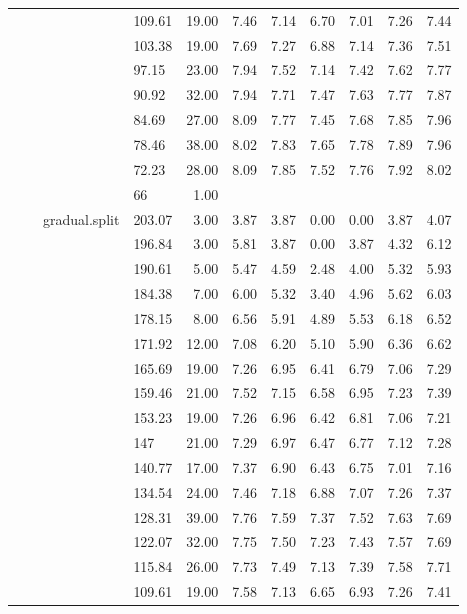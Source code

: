 \begin{longtable}{llllrrrrrrr}
   &  &  & 109.61 & 19.00 & 7.46 & 7.14 & 6.70 & 7.01 & 7.26 & 7.44 \\ 
   &  &  & 103.38 & 19.00 & 7.69 & 7.27 & 6.88 & 7.14 & 7.36 & 7.51 \\ 
   &  &  & 97.15 & 23.00 & 7.94 & 7.52 & 7.14 & 7.42 & 7.62 & 7.77 \\ 
   &  &  & 90.92 & 32.00 & 7.94 & 7.71 & 7.47 & 7.63 & 7.77 & 7.87 \\ 
   &  &  & 84.69 & 27.00 & 8.09 & 7.77 & 7.45 & 7.68 & 7.85 & 7.96 \\ 
   &  &  & 78.46 & 38.00 & 8.02 & 7.83 & 7.65 & 7.78 & 7.89 & 7.96 \\ 
   &  &  & 72.23 & 28.00 & 8.09 & 7.85 & 7.52 & 7.76 & 7.92 & 8.02 \\ 
   &  &  & 66 & 1.00 &  &  &  &  &  &  \\ 
   &  & gradual.split & 203.07 & 3.00 & 3.87 & 3.87 & 0.00 & 0.00 & 3.87 & 4.07 \\ 
   &  &  & 196.84 & 3.00 & 5.81 & 3.87 & 0.00 & 3.87 & 4.32 & 6.12 \\ 
   &  &  & 190.61 & 5.00 & 5.47 & 4.59 & 2.48 & 4.00 & 5.32 & 5.93 \\ 
   &  &  & 184.38 & 7.00 & 6.00 & 5.32 & 3.40 & 4.96 & 5.62 & 6.03 \\ 
   &  &  & 178.15 & 8.00 & 6.56 & 5.91 & 4.89 & 5.53 & 6.18 & 6.52 \\ 
   &  &  & 171.92 & 12.00 & 7.08 & 6.20 & 5.10 & 5.90 & 6.36 & 6.62 \\ 
   &  &  & 165.69 & 19.00 & 7.26 & 6.95 & 6.41 & 6.79 & 7.06 & 7.29 \\ 
   &  &  & 159.46 & 21.00 & 7.52 & 7.15 & 6.58 & 6.95 & 7.23 & 7.39 \\ 
   &  &  & 153.23 & 19.00 & 7.26 & 6.96 & 6.42 & 6.81 & 7.06 & 7.21 \\ 
   &  &  & 147 & 21.00 & 7.29 & 6.97 & 6.47 & 6.77 & 7.12 & 7.28 \\ 
   &  &  & 140.77 & 17.00 & 7.37 & 6.90 & 6.43 & 6.75 & 7.01 & 7.16 \\ 
   &  &  & 134.54 & 24.00 & 7.46 & 7.18 & 6.88 & 7.07 & 7.26 & 7.37 \\ 
   &  &  & 128.31 & 39.00 & 7.76 & 7.59 & 7.37 & 7.52 & 7.63 & 7.69 \\ 
   &  &  & 122.07 & 32.00 & 7.75 & 7.50 & 7.23 & 7.43 & 7.57 & 7.69 \\ 
   &  &  & 115.84 & 26.00 & 7.73 & 7.49 & 7.13 & 7.39 & 7.58 & 7.71 \\ 
   &  &  & 109.61 & 19.00 & 7.58 & 7.13 & 6.65 & 6.93 & 7.26 & 7.41 \\ 

\end{longtable}
